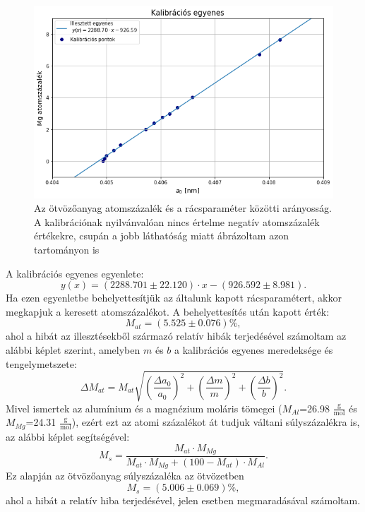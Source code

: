 \documentclass[12pt,a4paper]{article}
\begin{document}
\begin{figure}[!h]
\centering
\includegraphics[scale=0.65]{kalib}
\caption{Az ötvözőanyag atomszázalék és a rácsparaméter közötti arányosság. A kalibrációnak nyilvánvalóan nincs értelme negatív atomszázalék értékekre, csupán a jobb láthatóság miatt ábrázoltam azon tartományon is}
\label{fig:4}
\end{figure}
\newpage
A kalibrációs egyenes egyenlete:
$$y(x)= (2288.701 \pm 22.120) \cdot x - (926.592 \pm 8.981).$$
Ha ezen egyenletbe behelyettesítjük az általunk kapott rácsparamétert, akkor megkapjuk a keresett atomszázalékot. A behelyettesítés után kapott érték:
$$M_{at}=(5.525 \pm 0.076) \% ,$$
ahol a hibát az illesztésekből származó relatív hibák terjedésével számoltam az alábbi képlet szerint, amelyben $m$ és $b$ a kalibrációs egyenes meredeksége és tengelymetszete:
$$\Delta M_{at} = M_{at}\sqrt{\left(\frac{\Delta a_0}{a_0} \right)^2 + \left(\frac{\Delta m}{m}\right)^2 + \left(\frac{\Delta b}{b}\right)^2}.$$
Mivel ismertek az alumínium és a magnézium moláris tömegei ($M_{Al}$=26.98 $\frac{\mathrm{g}}{\mathrm{mol}}$ és $M_{Mg}$=24.31 $\frac{\mathrm{g}}{\mathrm{mol}}$), ezért ezt az atomi százalékot át tudjuk váltani súlyszázalékra is, az alábbi képlet segítségével:
$$M_{s}=\frac{M_{at} \cdot M_{Mg}}{M_{at}\cdot M_{Mg} + (100-  M_{at})\cdot M_{Al}}.$$
Ez alapján az ötvözőanyag súlyszázaléka az ötvözetben
$$M_s=(5.006 \pm 0.069) \% ,$$
ahol a hibát a relatív hiba terjedésével, jelen esetben megmaradásával számoltam. 
\newpage
\end{document}
